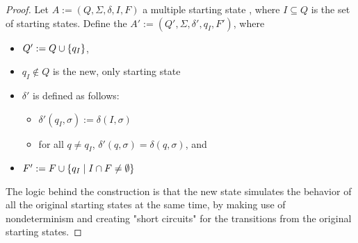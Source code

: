 \begin{proof}
	Let $A:=(Q,\Sigma,\delta,I,F)$ a multiple starting state \ONFA, where $I\subseteq Q$ is the set of starting states.
	Define the \ONFA $A':=(Q',\Sigma,\delta',q_I,F')$, where
	\begin{itemize}
		\item $Q':=Q\cup\{q_I\}$,
		\item $q_I\notin Q$ is the new, only starting state
		\item $\delta'$ is defined as follows:
		      \begin{itemize}
			      \item $\delta'(q_I,\sigma):=\delta(I,\sigma)$
			      \item for all $q\ne q_I$, $\delta'(q,\sigma)=\delta(q,\sigma)$, and
		      \end{itemize}
		\item $F':=F\cup\{q_I\mid I\cap F\ne\emptyset\}$
	\end{itemize}
	The logic behind the construction is that the new state simulates the behavior of all the original starting states at the same time, by making use of nondeterminism and creating "short circuits" for the transitions from the original starting states.


\end{proof}
